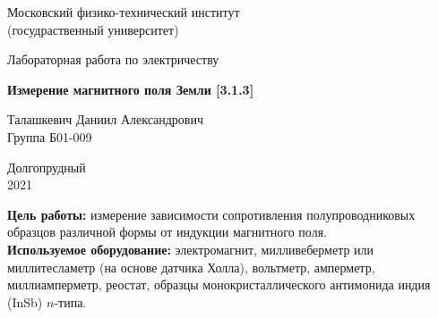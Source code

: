 \documentclass[a4paper, 12pt]{article}%
\begin{document}


\begin{titlepage}

	\newpage
	\begin{center}
		\normalsize Московский физико-технический институт \\(госудраственный 			университет)
	\end{center}

	\vspace{6em}

	\begin{center}
		\Large Лабораторная работа по электричеству\\
	\end{center}

	\vspace{1em}

	\begin{center}
		\large \textbf{Измерение магнитного поля Земли [3.1.3]}
	\end{center}

	\vspace{2em}

	\begin{center}
		\large Талашкевич Даниил Александрович\\
		Группа Б01-009
	\end{center}

	\vspace{\fill}

	\begin{center}
	Долгопрудный \\2021
	\end{center}
	
\end{titlepage}



	\thispagestyle{empty}
	\newpage
	\tableofcontents
	\newpage
	\setcounter{page}{1}


					
\textbf{Цель работы:} измерение зависимости сопротивления полупроводниковых образцов различной формы от индукции магнитного поля. \\

\textbf{Используемое оборудование:} электромагнит, милливеберметр или миллитесламетр (на основе датчика Холла), вольтметр, амперметр, миллиамперметр, реостат, образцы монокристаллического антимонида индия (InSb) $n$-типа.
                    
\end{document}
